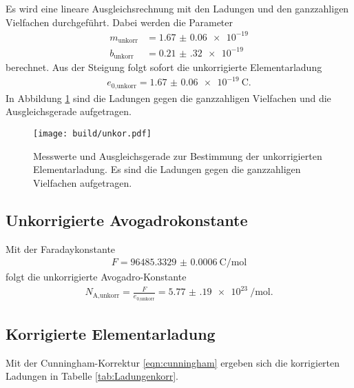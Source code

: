 \FloatBarrier

Es wird eine lineare Ausgleichsrechnung mit den Ladungen und den
ganzzahligen Vielfachen durchgeführt. Dabei werden die Parameter
\begin{align}
  m_\text{unkorr} & = \num{1.67(6)e-19} \\
  b_\text{unkorr} & = \num{0.21(32)e-19}
\end{align}
berechnet. Aus der Steigung folgt sofort die unkorrigierte Elementarladung
\begin{align}
  e_\text{0,unkorr} = \SI{1.67(6)e-19}{\coulomb}.
\end{align}
In Abbildung \ref{fig:elemunkorr} sind die Ladungen gegen die ganzzahligen
Vielfachen und die Ausgleichsgerade aufgetragen.

\begin{figure}
  \centering
  \texttt{[image: build/unkor.pdf]}
  \caption{Messwerte und Ausgleichsgerade zur Bestimmung der unkorrigierten Elementarladung.
  Es sind die Ladungen gegen die ganzzahligen Vielfachen aufgetragen.}
  \label{fig:elemunkorr}
\end{figure}

\FloatBarrier

\subsection{Unkorrigierte Avogadrokonstante}

Mit der Faradaykonstante \cite{Faraday}
\begin{align}
  F = \SI{96485.3329(6)}{\coulomb\per\mol}
\end{align}
folgt die unkorrigierte Avogadro-Konstante
\begin{align}
  N_\text{A,unkorr} = \frac{F}{e_\text{0,unkorr}} = \SI{5.77(19)e23}{\per\mol}.
\end{align}

\subsection{Korrigierte Elementarladung}

Mit der Cunningham-Korrektur \eqref{eqn:cunningham} ergeben sich die
korrigierten Ladungen in Tabelle \ref{tab:Ladungenkorr}.

